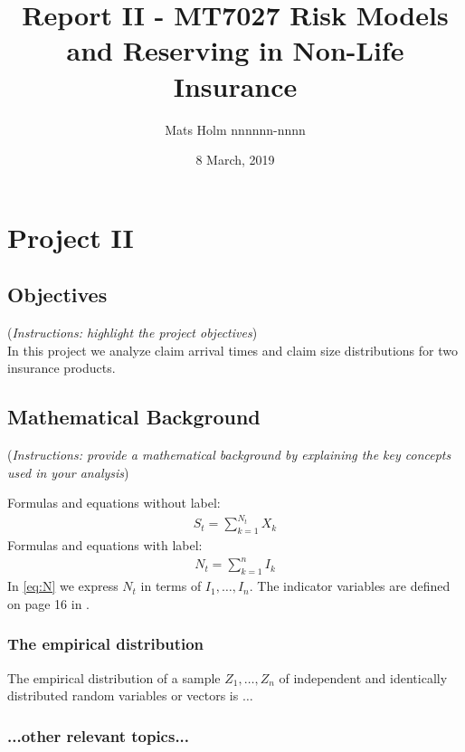 \documentclass[a4paper]{article}
\title{Report II - MT7027 Risk Models and Reserving in Non-Life Insurance}
\author{Mats Holm nnnnnn-nnnn }
\date{8 March, 2019}                                           %
\begin{document}
\maketitle
\section*{Project II}
\subsection*{Objectives}
({\it Instructions: highlight the project objectives})
\\
In this project we analyze claim
arrival times and claim size distributions for two insurance products.

\subsection*{Mathematical Background}
({\it Instructions: provide a mathematical background by explaining the key concepts used in your analysis})

Formulas and equations without label:
\begin{align*}
	S_t = \sum_{k=1}^{N_t} X_k
\end{align*}
Formulas and equations with label:
\begin{align}\label{eq:N}
	N_t = \sum_{k=1}^{n} I_k
\end{align}
In \eqref{eq:N} we express $N_t$ in terms of $I_1,\dots,I_n$. The indicator variables are defined on page 16 in \cite{Wuthrich-Merz-13}.

\subsubsection*{The empirical distribution}
The empirical distribution of a sample $Z_1, \dots, Z_n$ of independent and identically distributed random variables or vectors is $\ldots$

\subsubsection*{...other relevant topics...}
\end{document}
